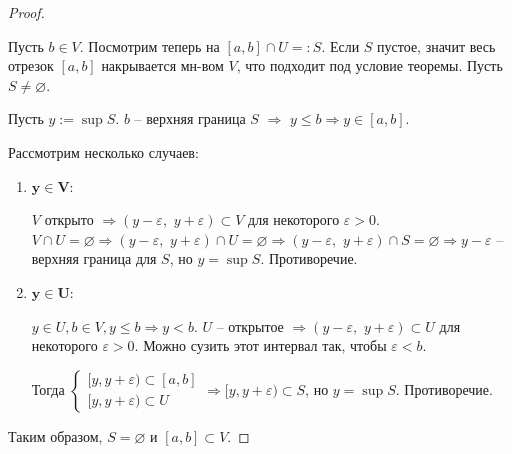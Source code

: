 \begin{proof} $ $

    Пусть $b \in V$. Посмотрим теперь на $[a, b] \cap U =: S$. Если 
    $S$ пустое, значит весь отрезок $[a, b]$ накрывается мн-вом $V$,
    что подходит под условие теоремы. Пусть $S \neq \varnothing$.

    Пусть $y := \sup S$. $b$ -- верхняя граница $S$ $\Rightarrow$
    $y \leqslant b \Rightarrow y \in [a, b]$.

    Рассмотрим несколько случаев:
    \begin{enumerate}
        \item $\mathbf{y \in V}$:
        
        $V$ открыто $\Rightarrow (y - \varepsilon,\,\, y + \varepsilon)
        \subset V$ для некоторого $\varepsilon > 0$. $V \cap U =
        \varnothing \Rightarrow (y - \varepsilon,\,\, y + \varepsilon)
        \cap U = \varnothing \Rightarrow (y - \varepsilon,\,\, y + \varepsilon)
        \cap S = \varnothing \Rightarrow y - \varepsilon$ -- верхняя 
        граница для $S$, но $y = \sup S$. Противоречие.

        \item $\mathbf{y \in U}$:
        
        $y \in U, b \in V, y \leqslant b \Rightarrow y < b$. $U$ -- открытое 
        $\Rightarrow (y - \varepsilon,\,\, y + \varepsilon) \subset U$ для 
        некоторого $\varepsilon > 0$. Можно сузить этот интервал так,
        чтобы $\varepsilon < b$.
        
        Тогда $\begin{cases}
            [y, y + \varepsilon) \subset [a, b] \\
            [y, y + \varepsilon) \subset U
        \end{cases} \Rightarrow [y, y + \varepsilon) \subset S$,
        но $y = \sup S$. Противоречие.
    \end{enumerate}

    Таким образом, $S = \varnothing$ и $[a, b] \subset V$.
\end{proof}